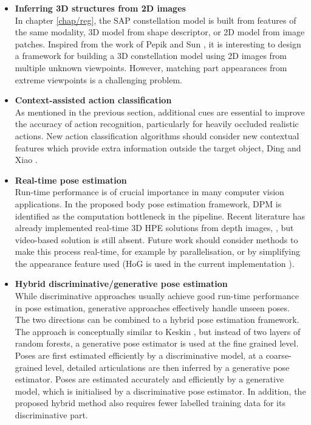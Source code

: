\begin{itemize}
	\item \textbf{Inferring 3D structures from 2D images} \\  
	In chapter \ref{chap/reg}, the SAP constellation model is built from features of the same modality, \eg 3D model from shape descriptor, or 2D model from image patches. Inspired from the work of Pepik \etal \cite{Pepik2012} and Sun \etal \cite{Sun2009}, it is interesting to design a framework for building a 3D constellation model using 2D images from multiple unknown viewpoints. However, matching part appearances from extreme viewpoints is a challenging problem.  
	\item \textbf{Context-assisted action classification} \\ 
	As mentioned in the previous section, additional cues are essential to improve the accuracy of action recognition, particularly for heavily occluded realistic actions. New action classification algorithms should consider new contextual features which provide extra information outside the target object, \eg Ding and Xiao \cite{Ding2012}.   
	\item \textbf{Real-time pose estimation}\\ 
	Run-time performance is of crucial importance in many computer vision applications. In the proposed body pose estimation framework, DPM is identified as the computation bottleneck in the pipeline. 
	Recent literature has already implemented real-time 3D HPE solutions from depth images, \eg \cite{Baak2011, Girshick2011, Sun2012}, but video-based solution is still absent.  
	Future work should consider methods to make this process real-time, for example by parallelisation, or by simplifying the appearance feature used (HoG is used in the current implementation \cite{Yang2011}).  
	\item \textbf{Hybrid discriminative/generative pose estimation}\\
	While discriminative approaches usually achieve good run-time performance in pose estimation, generative approaches effectively handle unseen poses. The two directions can be combined to a hybrid pose estimation framework. The approach is conceptually similar to Keskin \etal \cite{Keskin2012}, but instead of two layers of random forests, a generative pose estimator is used at the fine grained level. Poses are first estimated efficiently by a discriminative model, at a coarse-grained level, detailed articulations are then inferred by a generative pose estimator. Poses are estimated accurately and efficiently by a generative model, which is initialised by a discriminative pose estimator. In addition, the proposed hybrid method also requires fewer labelled training data for its discriminative part. 

\end{itemize}
